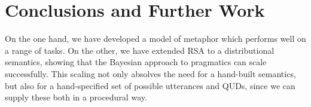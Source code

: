 \documentclass[10pt,letterpaper,twocolumn]{article}
\begin{document}








%
%
%



\section{Conclusions and Further Work}

On the one hand, we have developed a model of metaphor which performs well on a range of tasks. On the other, we have extended RSA to a distributional semantics, showing that the Bayesian approach to pragmatics can scale successfully. This scaling not only absolves the need for a hand-built semantics, but also for a hand-specified set of possible utterances and QUDs, since we can supply these both in a procedural way.
\end{document}
